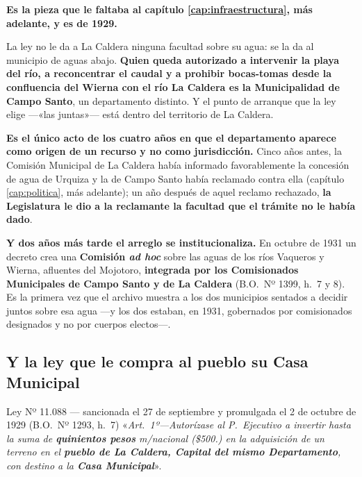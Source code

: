 \begin{cautela}
\textbf{Es la pieza que le faltaba al capítulo \ref{cap:infraestructura}, más adelante, y es de 1929.}

La ley no le da a La Caldera ninguna facultad sobre su agua: se la da al municipio de aguas
abajo. \textbf{Quien queda autorizado a intervenir la playa del río, a reconcentrar el caudal y a
prohibir bocas-tomas desde la confluencia del Wierna con el río La Caldera es la Municipalidad de
Campo Santo}, un departamento distinto. Y el punto de arranque que la ley elige ---«las juntas»---
está dentro del territorio de La Caldera.

\textbf{Es el único acto de los cuatro años en que el departamento aparece como origen de un
recurso y no como jurisdicción.} Cinco años antes, la Comisión Municipal de La Caldera había
informado favorablemente la concesión de agua de Urquiza y la de
Campo Santo había reclamado contra ella (capítulo \ref{cap:politica}, más adelante); un año después de aquel
reclamo rechazado, \textbf{la Legislatura le dio a la reclamante la facultad que el trámite no le
había dado}.

\textbf{Y dos años más tarde el arreglo se institucionaliza.} En octubre de 1931 un decreto crea
una \textbf{Comisión \textit{ad hoc}} sobre las aguas de los ríos Vaqueros y Wierna, afluentes
del Mojotoro, \textbf{integrada por los Comisionados Municipales de Campo Santo y de La Caldera}
(B.O.\ Nº 1399, h.\ 7 y 8). Es la primera vez que el archivo muestra a los dos municipios
sentados a decidir juntos sobre esa agua ---y los dos estaban, en 1931, gobernados por
comisionados designados y no por cuerpos electos---.
\end{cautela}

\subsection*{Y la ley que le compra al pueblo su Casa Municipal}

\begin{ficha}{Ley Nº 11.088 --- sancionada el 27 de septiembre y promulgada el 2 de octubre de 1929 (B.O.\ Nº 1293, h.\ 7)}
«\textit{Art.\ 1º---Autorízase al P.\ Ejecutivo a invertir hasta la suma de \textbf{quinientos
pesos} m/nacional (\$500.) en la adquisición de un terreno en el \textbf{pueblo de La Caldera,
Capital del mismo Departamento}, con destino a la \textbf{Casa Municipal}}».
\end{ficha}

